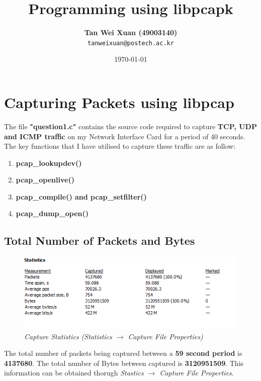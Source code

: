 \documentclass[a4paper,11pt]{article}
\begin{document}
\title{\vspace{-1.0cm}\textbf{Programming using libpcapk}}
\author{
  \textbf{Tan Wei Xuan (49003140)}\\
  \texttt{tanweixuan@postech.ac.kr}
}
\date{\today}
\maketitle

\section{Capturing Packets using libpcap}
The file \textbf{"question1.c"} contains the source code required to capture \textbf{TCP, UDP and ICMP traffic} on my Network Interface Card for a period of 40 seconds. The key functions that I have utilised to capture these traffic are as follow:
\begin{enumerate}
\item \textbf{pcap\_lookupdev()}
\item \textbf{pcap\_openlive()}
\item \textbf{pcap\_compile() and pcap\_setfilter()}
\item \textbf{pcap\_dump\_open()}
\end{enumerate}

\subsection{Total Number of Packets and Bytes}
\begin{figure}[h!]
	\includegraphics{TtlNoPacketsBytes}
	\caption{\textit{Capture Statistics (Statistics $\rightarrow$ Capture File Properties)}}
\end{figure}
The total number of packets being captured between a \textbf{59 second period} is \textbf{4137680}. The total number of Bytes between captured is \textbf{3120951509}. This information can be obtained thorugh \textit{Stastics $\rightarrow$ Capture File Properties}.
\end{document}
